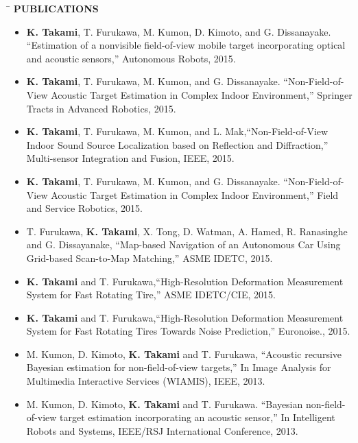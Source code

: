 \documentclass[11pt,letter]{article}
\begin{document}

\begin{tabbing}
	\hspace{1cm}\=\kill
	\>  {\bf \Large PUBLICATIONS}
\end{tabbing}\vspace{-2mm}
\vspace{-1.2cm}
\begin{tabbing}
\end{tabbing}
\begin{itemize}[leftmargin=*]
		\item {\bf K. Takami}, T. Furukawa, M. Kumon, D. Kimoto, and G. Dissanayake. ``Estimation of a nonvisible field-of-view mobile target incorporating optical and acoustic sensors,'' Autonomous Robots, 2015.
	\item {\bf K. Takami}, T. Furukawa, M. Kumon, and G. Dissanayake. ``Non-Field-of-View Acoustic Target Estimation in Complex Indoor Environment,'' Springer Tracts in Advanced Robotics, 2015.
	\item  {\bf K. Takami}, T. Furukawa, M. Kumon, and L. Mak,``Non-Field-of-View Indoor Sound Source Localization based on Reflection and Diffraction,'' Multi-sensor Integration and Fusion, IEEE, 2015.
	\item {\bf K. Takami}, T. Furukawa, M. Kumon, and G. Dissanayake. ``Non-Field-of-View Acoustic Target Estimation in Complex Indoor Environment,'' Field and Service Robotics, 2015.
	\item  T. Furukawa, {\bf K. Takami}, X. Tong, D. Watman, A. Hamed, R. Ranasinghe and G. Dissayanake, ``Map-based Navigation of an Autonomous Car Using Grid-based Scan-to-Map Matching,'' ASME IDETC, 2015.
	\item  {\bf K. Takami} and T. Furukawa,``High-Resolution Deformation Measurement System for Fast Rotating Tire,'' ASME IDETC/CIE, 2015.
	\item  {\bf K. Takami} and T. Furukawa,``High-Resolution Deformation Measurement System for Fast Rotating Tires Towards Noise Prediction,'' Euronoise., 2015.
	\item M. Kumon, D. Kimoto, {\bf K. Takami} and T. Furukawa, ``Acoustic recursive Bayesian estimation for non-field-of-view targets,'' In Image Analysis for Multimedia Interactive Services (WIAMIS), IEEE, 2013.
	\item M. Kumon, D. Kimoto, {\bf K. Takami} and T. Furukawa. ``Bayesian non-field-of-view target estimation incorporating an acoustic sensor,'' In Intelligent Robots and Systems, IEEE/RSJ International Conference, 2013.

\end{itemize}
\end{document}
